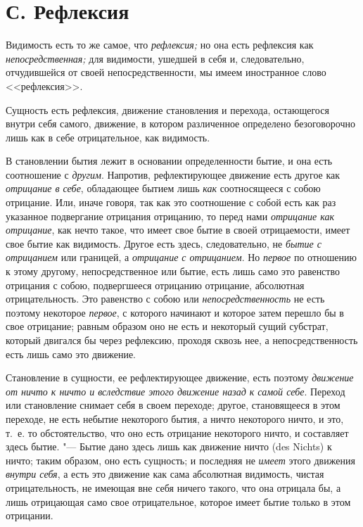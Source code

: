 \section[С. Рефлексия]{С. Рефлексия}
Видимость есть то же самое, что
{\em рефлексия;} но она есть рефлексия как
{\em непосредственная;} для видимости, ушедшей в себя
и, следовательно, отчудившейся от своей непосредственности, мы имеем
иностранное слово <<рефлексия>>.

Сущность есть рефлексия, движение становления и перехода, остающегося внутри
себя самого, движение, в котором различенное определено безоговорочно лишь
как в себе отрицательное, как видимость.

В становлении бытия лежит в основании определенности бытие, и она есть
соотношение с {\em другим}. Напротив, рефлектирующее
движение есть другое как {\em отрицание в себе},
обладающее бытием лишь {\em как} соотносящееся с собою
отрицание. Или, иначе говоря, так как это соотношение с собой есть как раз
указанное подвергание отрицания отрицанию, то перед нами
{\em отрицание как отрицание}, как нечто такое, что
имеет свое бытие в своей отрицаемости, имеет свое бытие как видимость.
Другое есть здесь, следовательно, не {\em бытие с
отрицанием} или границей, а {\em отрицание с
отрицанием}. Но {\em первое} по отношению к этому
другому, непосредственное или бытие, есть лишь само это равенство отрицания
с собою, подвергшееся отрицанию отрицание, абсолютная отрицательность. Это
равенство с собою или {\em непосредственность} не есть
поэтому некоторое {\em первое}, с которого начинают и
которое затем перешло бы в свое отрицание; равным образом оно не есть и
некоторый сущий субстрат, который двигался бы через рефлексию, проходя
сквозь нее, а непосредственность есть лишь само это движение.

Становление в сущности, ее рефлектирующее движение, есть поэтому
{\em движение от ничто к ничто и вследствие этого
движение назад к самой себе}. Переход или становление снимает себя в своем
переходе; другое, становящееся в этом переходе, не есть небытие некоторого
бытия, а ничто некоторого ничто, и это, т.~е. то обстоятельство, что оно
есть отрицание некоторого ничто, и составляет здесь бытие. "--- Бытие дано
здесь лишь как движение ничто (des Nichts) к ничто; таким образом, оно есть
сущность; и последняя не {\em имеет} этого движения
{\em внутри себя}, а есть это движение как сама
абсолютная видимость, чистая отрицательность, не имеющая вне себя ничего
такого, что она отрицала бы, а лишь отрицающая само свое отрицательное,
которое имеет бытие только в этом отрицании.

